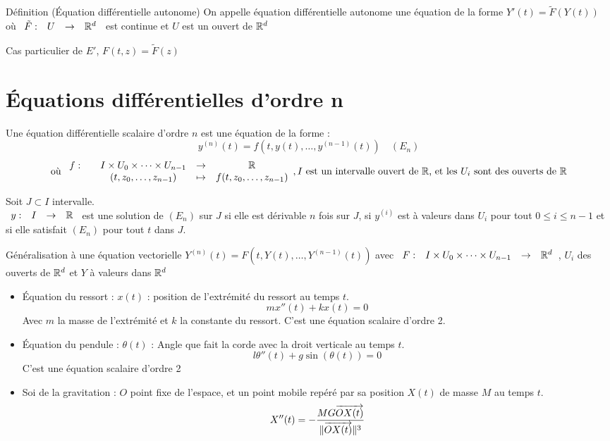 \documentclass[]{report}
\begin{document}
\begin{df}{Définition (Équation différentielle autonome)}{}
    On appelle équation différentielle autonome une équation de la forme $Y'(t)=\tilde{F}(Y(t))$ où $\begin{array}{ccccc} \tilde{F} : & U & \to & \mathbb{R}^d \end{array}$ est continue et $U$ est un ouvert de $\mathbb{R}^d$
\end{df}

\begin{re}{}{}
    Cas particulier de $E'$, $F(t,z)=\tilde{F}(z)$
\end{re}

\section{Équations différentielles d'ordre n}

Une équation différentielle scalaire d'ordre $n$ est une équation de la forme :
$$y^{(n)}(t)=f(t,y(t),\dots,y^{(n-1)}(t))\quad (E_n)$$
$$\text{où }\begin{array}{ccccc} f : & & I\times U_0\times\dots\times U_{n-1} & \to & \mathbb{R} \\ & & (t,z_0,\dots,z_{n-1}) & \mapsto & f(t,z_0,\dots,z_{n-1}) \end{array},I\text{ est un intervalle ouvert de }\mathbb{R} \text{, et les } U_i\text{ sont des ouverts de }\mathbb{R}$$

\begin{df}{}{}
    Soit $J\subset I$ intervalle.\\
    $\begin{array}{ccccc} y : & I & \to & \mathbb{R} \end{array}$ est une solution de $(E_n)$ sur $J$ si elle est dérivable $n$ fois sur $J$, si $y^{(i)}$ est à valeurs dans $U_i$ pour tout $0\le i\le n-1$ et si elle satisfait $(E_n)$ pour tout $t$ dans $J$.
\end{df}

\begin{df}{Généralisation à une équation vectorielle}{}
    $Y^{(n)}(t)=F(t,Y(t),\dots,Y^{(n-1)}(t))$ avec $\begin{array}{ccccc} F : & I\times U_0\times \dots\times U_{n-1} & \to & \mathbb{R}^d \end{array}$, $U_i$ des ouverts de $\mathbb{R}^d$ et $Y$ à valeurs dans $\mathbb{R}^d$
\end{df}

\begin{ex}{}{}
    \begin{itemize}
        \item Équation du ressort :
        $x(t)$ : position de l’extrémité  du ressort au temps $t$. $$mx''(t)+kx(t)=0$$
        Avec $m$ la masse de l’extrémité et $k$ la constante du ressort. C'est une équation scalaire d'ordre 2.
        \item Équation du pendule :
        $\theta(t)$ : Angle que fait la corde avec la droit verticale au temps $t$.$$l\theta''(t)+g\sin(\theta(t))=0$$
        C'est une équation scalaire d'ordre 2
        \item Soi de la gravitation :
        $O$ point fixe de l'espace, et un point mobile repéré par sa position $X(t)$ de masse $M$ au temps $t$.$$X''(t)=-\frac{MG\overrightarrow{OX(t)}}{\lVert \overrightarrow{OX(t)} \rVert^3}$$
    \end{itemize}
\end{ex}
\end{document}
